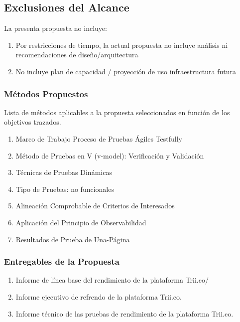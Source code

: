 \documentclass[
  paper=a4,
  ,captions=tableheading
]{scrartcl}
\providecommand{\tightlist}{%
  \setlength{\itemsep}{0pt}\setlength{\parskip}{0pt}}
\begin{document}
\subsection{Exclusiones del Alcance}\label{sec:exclusiones-del-alcance}

La presenta propuesta no incluye:

\begin{enumerate}
\def\labelenumi{\arabic{enumi}.}
\tightlist
\item
  Por restricciones de tiempo, la actual propuesta no incluye análisis
  ni recomendaciones de diseño/arquitectura
\item
  No incluye plan de capacidad / proyección de uso infraestructura
  futura
\end{enumerate}

\subsubsection{Métodos Propuestos}\label{sec:muxe9todos-propuestos}

Lista de métodos aplicables a la propuesta seleccionados en función de
los objetivos trazados.

\begin{enumerate}
\def\labelenumi{\arabic{enumi}.}
\tightlist
\item
  Marco de Trabajo Proceso de Pruebas Ágiles Testfully
\item
  Método de Pruebas en V (v-model): Verificación y Validación
\item
  Técnicas de Pruebas Dinámicas
\item
  Tipo de Pruebas: no funcionales
\item
  Alineación Comprobable de Criterios de Interesados
\item
  Aplicación del Principio de Observabilidad
\item
  Resultados de Prueba de Una-Página
\end{enumerate}

\subsubsection{Entregables de la
Propuesta}\label{sec:entregables-de-la-propuesta}

\begin{enumerate}
\def\labelenumi{\arabic{enumi}.}
\tightlist
\item
  Informe de línea base del rendimiento de la plataforma Trii.co/
\item
  Informe ejecutivo de refrendo de la plataforma Trii.co.
\item
  Informe técnico de las pruebas de rendimiento de la plataforma
  Trii.co.
\end{enumerate}
\end{document}
